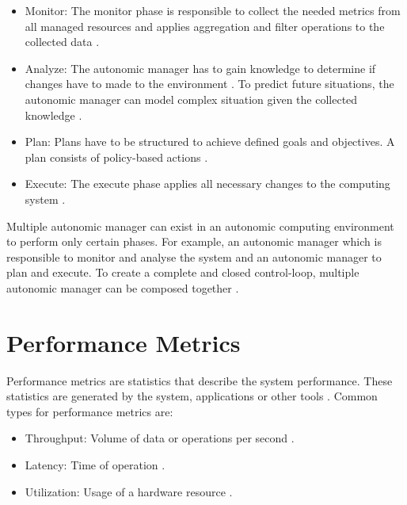\begin{itemize}
\item Monitor:
The monitor phase is responsible to collect the needed metrics from all managed resources and applies aggregation and filter operations to the collected data \cite{Sinreich2006AnAB}.

\item Analyze:
The autonomic manager has to gain knowledge to determine if changes have to made to the environment \cite{Sinreich2006AnAB}. To predict future situations, the autonomic manager can model complex situation given the collected knowledge \cite{Jacob2004AutonomicSolution}.

\item Plan:
Plans have to be structured to achieve defined goals and objectives. A plan consists of policy-based actions \cite{Jacob2004AutonomicSolution, Sinreich2006AnAB}.

\item Execute:
The execute phase applies all necessary changes to the computing system \cite{Sinreich2006AnAB}.
\end{itemize}

Multiple autonomic manager can exist in an autonomic computing environment to perform only certain phases. For example, an autonomic manager which is responsible to monitor and analyse the system and an autonomic manager to plan and execute. To create a complete and closed control-loop, multiple autonomic manager can be composed together \cite{Sinreich2006AnAB}.


\section{Performance Metrics}
Performance metrics are statistics that describe the system performance. These statistics are generated by the system, applications or other tools \cite{Greg2020SysPerf}.
Common types for performance metrics are:
\begin{itemize}
\item Throughput: Volume of data or operations per second \cite{Greg2020SysPerf}.
\item Latency: Time of operation \cite{Greg2020SysPerf}.
\item Utilization: Usage of a hardware resource \cite{Greg2020SysPerf}.
\end{itemize}



